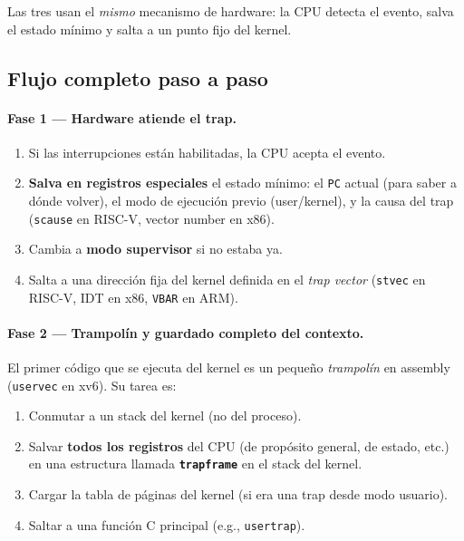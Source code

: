 \documentclass[11pt,a4paper]{article}
\begin{document}
Las tres usan el \emph{mismo} mecanismo de hardware: la CPU detecta
el evento, salva el estado mínimo y salta a un punto fijo del kernel.

\subsection*{Flujo completo paso a paso}

\paragraph{Fase 1 --- Hardware atiende el trap.}

\begin{enumerate}[leftmargin=*]
    \item Si las interrupciones están habilitadas, la CPU acepta el
        evento.
    \item \textbf{Salva en registros especiales} el estado mínimo:
        el \texttt{PC} actual (para saber a dónde volver), el modo
        de ejecución previo (user/kernel), y la causa del trap
        (\texttt{scause} en RISC-V, vector number en x86).
    \item Cambia a \textbf{modo supervisor} si no estaba ya.
    \item Salta a una dirección fija del kernel definida en el
        \emph{trap vector} (\texttt{stvec} en RISC-V, IDT en x86,
        \texttt{VBAR} en ARM).
\end{enumerate}

\paragraph{Fase 2 --- Trampolín y guardado completo del contexto.}

El primer código que se ejecuta del kernel es un pequeño
\emph{trampolín} en assembly (\texttt{uservec} en xv6). Su tarea es:

\begin{enumerate}[leftmargin=*]
    \item Conmutar a un stack del kernel (no del proceso).
    \item Salvar \textbf{todos los registros} del CPU (de propósito
        general, de estado, etc.) en una estructura llamada
        \textbf{\texttt{trapframe}} en el stack del kernel.
    \item Cargar la tabla de páginas del kernel (si era una trap
        desde modo usuario).
    \item Saltar a una función C principal (e.g., \texttt{usertrap}).
\end{enumerate}
\end{document}
